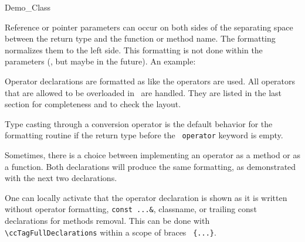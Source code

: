 \documentclass[12pt]{article}
\begin{document}
\begin{ccClass}{Demo_Class}
{  



Reference or pointer parameters can occur on both sides of the
separating space between the return type and the function or method
name. The formatting normalizes them to the left side. This
formatting is not done within the parameters (, but maybe in the
future). An example: 





Operator declarations are formatted as like the operators are
used.  All operators that are allowed to be overloaded in \CC\ are
handled. They are listed in the last section for completeness and
to check the layout. 

Type casting through a conversion operator is the default behavior 
for the formatting routine if the return type before the {\tt 
operator} keyword is empty.



Sometimes, there is a choice between
implementing an operator as a method or as a function. Both
declarations will produce the same formatting, as demonstrated
with the next two declarations.



One can locally activate that the operator declaration is shown as it
is written without operator formatting, {\tt const ...\&}, classname, or
trailing const declarations for methods removal. This can be done with
\verb+\+\verb+ccTagFullDeclarations+ within a scope of braces {\tt
  \{...\}}.

}
\end{ccClass}
\end{document}
